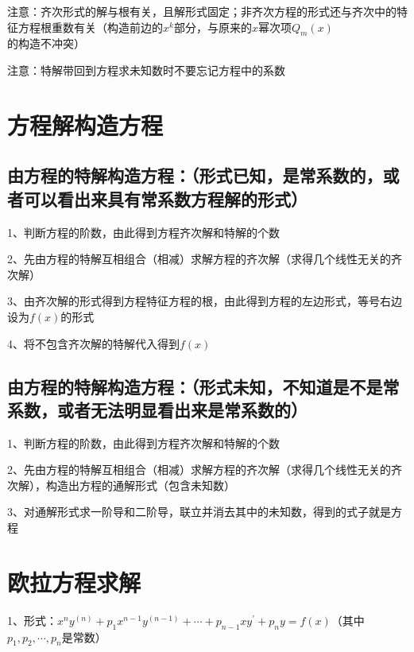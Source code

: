 注意：齐次形式的解与根有关，且解形式固定；非齐次方程的形式还与齐次中的特征方程根重数有关（构造前边的$x^{k}$部分，与原来的$x$幂次项$Q_{m}(x)$的构造不冲突）

注意：特解带回到方程求未知数时不要忘记方程中的系数

\section{方程解构造方程}



\subsection{由方程的特解构造方程：（形式已知，是常系数的，或者可以看出来具有常系数方程解的形式）}

1、判断方程的阶数，由此得到方程齐次解和特解的个数

2、先由方程的特解互相组合（相减）求解方程的齐次解（求得几个线性无关的齐次解）

3、由齐次解的形式得到方程特征方程的根，由此得到方程的左边形式，等号右边设为$f(x)$的形式

4、将不包含齐次解的特解代入得到$f(x)$



\subsection{由方程的特解构造方程：（形式未知，不知道是不是常系数，或者无法明显看出来是常系数的）}

1、判断方程的阶数，由此得到方程齐次解和特解的个数

2、先由方程的特解互相组合（相减）求解方程的齐次解（求得几个线性无关的齐次解），构造出方程的通解形式（包含未知数）

3、对通解形式求一阶导和二阶导，联立并消去其中的未知数，得到的式子就是方程

\section{欧拉方程求解}

1、形式：$x^{n} y^{(n)}+p_{1} x^{n-1} y^{(n-1)}+\cdots+p_{n-1} x y^{\prime}+p_{n} y=f(x)$（其中$p_{1}, p_{2}, \cdots, p_{n}$是常数）

